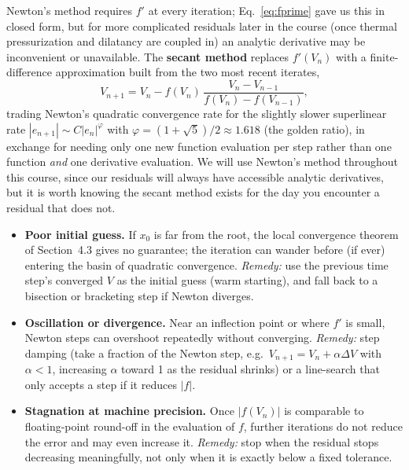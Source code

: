 \begin{remark}
Newton's method requires $f'$ at every iteration; Eq.~\eqref{eq:fprime} gave us this in closed form, but for more complicated residuals later in the course (once thermal pressurization and dilatancy are coupled in) an analytic derivative may be inconvenient or unavailable. The \textbf{secant method} replaces $f'(V_n)$ with a finite-difference approximation built from the two most recent iterates,
\begin{equation}
V_{n+1} = V_n - f(V_n)\,\frac{V_n - V_{n-1}}{f(V_n)-f(V_{n-1})},
\end{equation}
trading Newton's quadratic convergence rate for the slightly slower superlinear rate $|e_{n+1}| \sim C|e_n|^{\varphi}$ with $\varphi = (1+\sqrt5)/2 \approx 1.618$ (the golden ratio), in exchange for needing only one new function evaluation per step rather than one function \emph{and} one derivative evaluation. We will use Newton's method throughout this course, since our residuals will always have accessible analytic derivatives, but it is worth knowing the secant method exists for the day you encounter a residual that does not.
\end{remark}

\begin{itemize}
\item \textbf{Poor initial guess.} If $x_0$ is far from the root, the local convergence theorem of Section~4.3 gives no guarantee; the iteration can wander before (if ever) entering the basin of quadratic convergence. \emph{Remedy:} use the previous time step's converged $V$ as the initial guess (warm starting), and fall back to a bisection or bracketing step if Newton diverges.
\item \textbf{Oscillation or divergence.} Near an inflection point or where $f'$ is small, Newton steps can overshoot repeatedly without converging. \emph{Remedy:} step damping (take a fraction of the Newton step, e.g.\ $V_{n+1} = V_n + \alpha \Delta V$ with $\alpha < 1$, increasing $\alpha$ toward 1 as the residual shrinks) or a line-search that only accepts a step if it reduces $|f|$.
\item \textbf{Stagnation at machine precision.} Once $|f(V_n)|$ is comparable to floating-point round-off in the evaluation of $f$, further iterations do not reduce the error and may even increase it. \emph{Remedy:} stop when the residual stops decreasing meaningfully, not only when it is exactly below a fixed tolerance.
\end{itemize}

